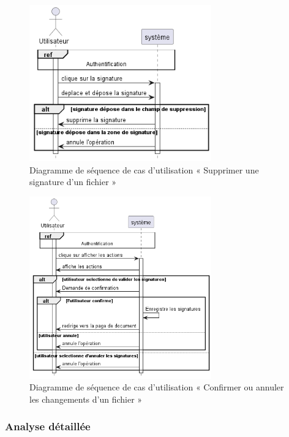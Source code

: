 \begin{figure}[H]
  \centering
  \includegraphics[width=0.7\textwidth]{out/diagrams/sprint4/delete_signature/delete_signature}
  \caption{Diagramme de séquence de cas d'utilisation « Supprimer une signature d'un fichier »}
  \label{fig:sequence_delete_signature_sp4}
\end{figure}
\begin{figure}[H]
  \centering
  \includegraphics[width=0.7\textwidth]{out/diagrams/sprint4/save_cancel_siganture/save_cancel_siganture}
  \caption{Diagramme de séquence de cas d'utilisation « Confirmer ou annuler les changements d'un fichier »}
  \label{fig:sequence_save_cancel_siganture}
\end{figure}



\subsubsection{Analyse détaillée}

